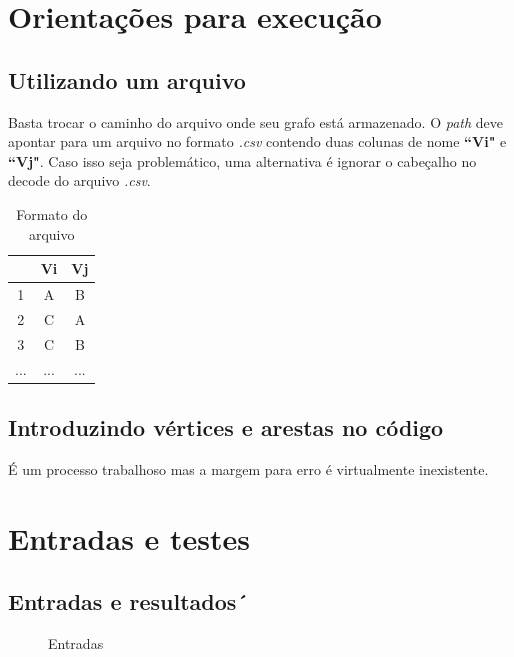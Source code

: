 \section{Orientações para execução}
\subsection{Utilizando um arquivo}
Basta trocar o caminho do arquivo onde seu grafo está armazenado. O \textit{path} deve apontar para um arquivo no formato \textit{.csv} contendo duas colunas de nome \textbf{``Vi"} e \textbf{``Vj"}. Caso isso seja problemático, uma alternativa é ignorar o cabeçalho no decode do arquivo \textit{.csv}. 

\begin{table}[h!]
	\centering
	\begin{tabular}{c| cc}
		\hline
		  & Vi & Vj \\
		  \hline
		1 & A  & B \\
		2 & C  & A \\
		3 & C  & B \\
		... & ... & ... \\
		\hline
	\end{tabular}
	\caption{Formato do arquivo}
\end{table}

\subsection{Introduzindo vértices e arestas no código}
É um processo trabalhoso mas a margem para erro é virtualmente inexistente. 

\section{Entradas e testes}
\subsection{Entradas e resultados´}
\begin{figure}[h!]
	\centering
	
	
	\caption{Entradas}
	\label{fig:exercicio}
\end{figure}


